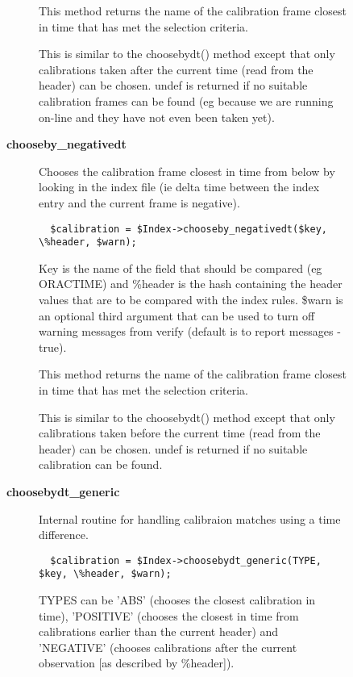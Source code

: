 \begin{description}
\begin{description}
\begin{description}
This method returns the name of the calibration frame closest in
time that has met the selection criteria.



This is similar to the choosebydt() method except that only
calibrations taken after the current time (read from the
header) can be chosen. undef is returned if no suitable
calibration frames can be found (eg because we are running
on-line and they have not even been taken yet).


\item[{\textbf{chooseby\_negativedt}}] \mbox{}

Chooses the calibration frame closest in time from below by looking
in the index file (ie delta time between the index entry and the
current frame is negative).

\begin{verbatim}
  $calibration = $Index->chooseby_negativedt($key, \%header, $warn);
\end{verbatim}


Key is the name of the field that should be compared (eg ORACTIME)
and \%header is the hash containing the header values that are to
be compared with the index rules. \$warn is an optional third argument
that can be used to turn off warning messages from verify (default
is to report messages - true).



This method returns the name of the calibration frame closest in
time that has met the selection criteria.



This is similar to the choosebydt() method except that only
calibrations taken before the current time (read from the
header) can be chosen. undef is returned if no suitable
calibration can be found.


\item[{\textbf{choosebydt\_generic}}] \mbox{}

Internal routine for handling calibraion matches using a
time difference.

\begin{verbatim}
  $calibration = $Index->choosebydt_generic(TYPE, $key, \%header, $warn);
\end{verbatim}


TYPES can be 'ABS' (chooses the closest calibration in time),
'POSITIVE' (chooses the closest in time from calibrations earlier
than the current header) and 'NEGATIVE' (chooses calibrations after
the current observation [as described by \%header]).




\end{description}
\end{description}
\end{description}

